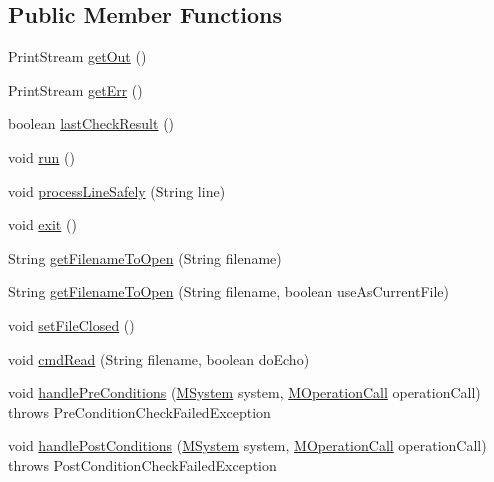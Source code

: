 \subsection*{Public Member Functions}
\begin{DoxyCompactItemize}
\item 
Print\-Stream \hyperlink{classorg_1_1tzi_1_1use_1_1main_1_1shell_1_1_shell_a45d18c4f6f9c3710ed2692be6a995c29}{get\-Out} ()
\item 
Print\-Stream \hyperlink{classorg_1_1tzi_1_1use_1_1main_1_1shell_1_1_shell_a497090ca55e6c0e7db8a89b45e2fd8a0}{get\-Err} ()
\item 
boolean \hyperlink{classorg_1_1tzi_1_1use_1_1main_1_1shell_1_1_shell_af079979e13208811de2dd3b84b7749d2}{last\-Check\-Result} ()
\item 
void \hyperlink{classorg_1_1tzi_1_1use_1_1main_1_1shell_1_1_shell_aa3958d943d2d433053e5b62356cfc0f9}{run} ()
\item 
void \hyperlink{classorg_1_1tzi_1_1use_1_1main_1_1shell_1_1_shell_acfb93c7a7323e0fbb2fd535fa1a5740f}{process\-Line\-Safely} (String line)
\item 
void \hyperlink{classorg_1_1tzi_1_1use_1_1main_1_1shell_1_1_shell_a3ac1184ed3b55292cde5011f2fdfd708}{exit} ()
\item 
String \hyperlink{classorg_1_1tzi_1_1use_1_1main_1_1shell_1_1_shell_abddf4e3c9620afd9698f53953d6486e3}{get\-Filename\-To\-Open} (String filename)
\item 
String \hyperlink{classorg_1_1tzi_1_1use_1_1main_1_1shell_1_1_shell_a241663f3bae2a7a3196335c68f2b20aa}{get\-Filename\-To\-Open} (String filename, boolean use\-As\-Current\-File)
\item 
void \hyperlink{classorg_1_1tzi_1_1use_1_1main_1_1shell_1_1_shell_aaaf8ecebbea8183dd8d32d93fe95149c}{set\-File\-Closed} ()
\item 
void \hyperlink{classorg_1_1tzi_1_1use_1_1main_1_1shell_1_1_shell_a6c6aa5f84f7a56865bcc17955d737edb}{cmd\-Read} (String filename, boolean do\-Echo)
\item 
void \hyperlink{classorg_1_1tzi_1_1use_1_1main_1_1shell_1_1_shell_a74e0e3a62a24ea503b7e74a911cd5d79}{handle\-Pre\-Conditions} (\hyperlink{classorg_1_1tzi_1_1use_1_1uml_1_1sys_1_1_m_system}{M\-System} system, \hyperlink{classorg_1_1tzi_1_1use_1_1uml_1_1sys_1_1_m_operation_call}{M\-Operation\-Call} operation\-Call)  throws Pre\-Condition\-Check\-Failed\-Exception 
\item 
void \hyperlink{classorg_1_1tzi_1_1use_1_1main_1_1shell_1_1_shell_a319e740bc330bd04e5501f2292455503}{handle\-Post\-Conditions} (\hyperlink{classorg_1_1tzi_1_1use_1_1uml_1_1sys_1_1_m_system}{M\-System} system, \hyperlink{classorg_1_1tzi_1_1use_1_1uml_1_1sys_1_1_m_operation_call}{M\-Operation\-Call} operation\-Call)  throws Post\-Condition\-Check\-Failed\-Exception 

\end{DoxyCompactItemize}
